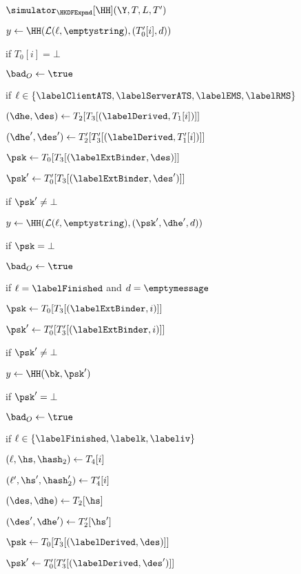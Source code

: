 \begin{figure}[tp]
\begin{minipage}[t]{0.49\textwidth}
\begin{oracle}{$\simulator_{\HKDFExpnd}[\HH](\Y, T, L, T')$}
			\item \quad $y \gets \HH(\mathcal{L}(\ell,\emptystring),(T'_{0}[i], d))$
			\item \quad if $T_{0}[i] = \bot$
			\item \quad \quad $\bad_O \gets \true$
			\item
			\item if $\ell \in \{ \labelClientATS, \labelServerATS,\labelEMS, \labelRMS \}$
			\item \quad $(\dhe, \des) \gets T_2[T_3[(\labelDerived, T_1[i])]]$
			\item \quad $(\dhe', \des') \gets T'_2[T'_3[(\labelDerived, T'_1[i])]]$
			\item \quad $\psk \gets T_0[T_3[(\labelExtBinder, \des)]]$
			\item \quad $\psk' \gets T'_0[T_3[(\labelExtBinder, \des')]]$
			\item \quad if $\psk' \neq \bot$
			\item \quad \quad $y \gets \HH(\mathcal{L} (\ell,\emptystring),(\psk', \dhe', d))$ 
			\item \quad \quad if $\psk = \bot$
			\item \quad \quad \quad $\bad_O \gets \true$
			\item
			\item if $\ell = \labelFinished$ and $d = \emptymessage$ 
			\item \quad $\psk \gets T_0[T_3[(\labelExtBinder, i)]]$
			\item \quad $\psk' \gets T'_0[T'_3[(\labelExtBinder, i)]]$
			\item \quad if $\psk' \neq \bot$ 
			\item \quad \quad $y \gets \HH(\bk, \psk')$
			\item \quad \quad if $\psk' =\bot$
			\item \quad \quad \quad $\bad_O \gets \true$
			\item 
			\item if $\ell \in \{\labelFinished, \labelk, \labeliv \}$
			\item \quad $(\ell, \hs, \hash_2) \gets T_4[i]$
			\item \quad $(\ell', \hs', \hash'_2) \gets T'_4[i]$
			\item \quad $(\des, \dhe) \gets T_2[\hs]$
			\item \quad $(\des', \dhe') \gets T'_2[\hs']$
			\item \quad $\psk \gets T_0[T_3[(\labelDerived, \des)]]$
			\item \quad $\psk' \gets T'_0[T'_3[(\labelDerived, \des')]]$

\end{oracle}
\end{minipage}
\end{figure}
